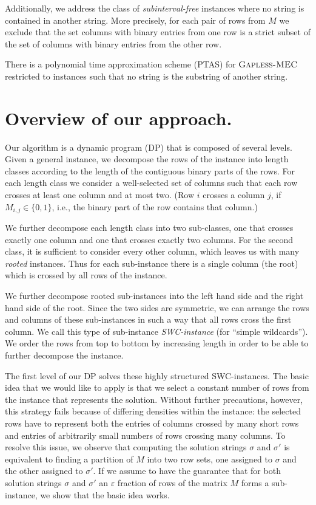 Additionally, we address the class of \emph{subinterval-free} \GMEC instances where no string is contained in another string.
More precisely, for each pair of rows from $M$ we exclude that the set columns with binary entries from one row is a strict subset of
the set of columns with binary entries from the other row.

\begin{theorem}\label{thm:ptas}
    There is a polynomial time approximation scheme (PTAS) for $\textsc{Gapless-MEC}$ restricted to instances such that no string is the substring of another string.
\end{theorem}

\section{Overview of our approach.}
Our algorithm is a dynamic program (DP) that is composed of several levels.
Given a general \GMEC instance, we decompose the rows of the instance into length classes according to the length of the contiguous binary parts of the rows.
For each length class we consider a well-selected set of columns such that each row crosses at least one column and at most two.
(Row $i$ crosses a column $j$, if $M_{i,j} \in \{0,1\}$, i.e., the binary part of the row contains that column.)

We further decompose each length class into two sub-classes, one that crosses exactly one column and one that crosses exactly two columns.
For the second class, it is sufficient to consider every other column, which leaves us with many \emph{rooted} instances.
Thus for each sub-instance there is a single column (the root) which is crossed by all rows of the instance.

We further decompose rooted sub-instances into the left hand side and the right hand side of the root.
Since the two sides are symmetric, we can arrange the rows and columns of these sub-instances in such a way that all rows cross the first column.
We call this type of sub-instance \emph{SWC-instance} (for ``simple wildcards'').
We order the rows from top to bottom by increasing length in order to be able to further decompose the instance.

The first level of our DP solves these highly structured SWC-instances.
The basic idea that we would like to apply is that we select a constant number of rows from the instance that represents the solution.
Without further precautions, however, this strategy fails because of differing densities within the instance: 
the selected rows have to represent both the entries of columns crossed by many short rows and entries of arbitrarily small numbers of rows crossing many columns.
To resolve this issue, we observe that computing the solution strings $\sigma$ and $\sigma'$ is equivalent to finding a partition of $M$ into two row sets, one assigned to $\sigma$ and the other assigned to $\sigma'$.
If we assume to have the guarantee that for both solution strings $\sigma$ and $\sigma'$ an $\varepsilon$ fraction of rows of the matrix $M$ forms a \BMEC sub-instance, we show that the basic idea works.

